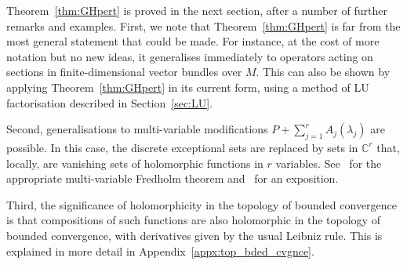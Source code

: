 \documentclass[pdftex]{sigma}
\numberwithin{equation}{section}
\newcommand{\CC}{{\mathbb C}}
\begin{document}
 Theorem~\ref{thm:GHpert} is proved in the next section, after a number of further remarks and examples. First, we note that Theorem~\ref{thm:GHpert} is far from the most general statement that could be made. For instance, at the cost of more notation but no new ideas, it generalises immediately to operators acting on sections in finite-dimensional vector bundles over $M$. This can also be shown by applying Theorem~\ref{thm:GHpert} in its current form, using a method of LU factorisation described in Section~\ref{sec:LU}.

 Second, generalisations to multi-variable modifications $P+ \sum_{j=1}^r A_j(\lambda_j)$ are possible. In this case, the discrete exceptional sets are replaced by sets in $\CC^r$ that, locally, are vanishing sets of holomorphic functions in $r$ variables. See~\cite{Gramsch:1970} for the appropriate multi-variable Fredholm theorem and~\cite{Kaballo:2012} for an exposition.

 Third, the significance of holomorphicity in the topology of bounded convergence is that compositions of such functions are also holomorphic in the topology of bounded convergence, with derivatives given by the usual Leibniz rule. This is explained in more detail in Appendix~\ref{appx:top_bded_cvgnce}.
\end{document}
